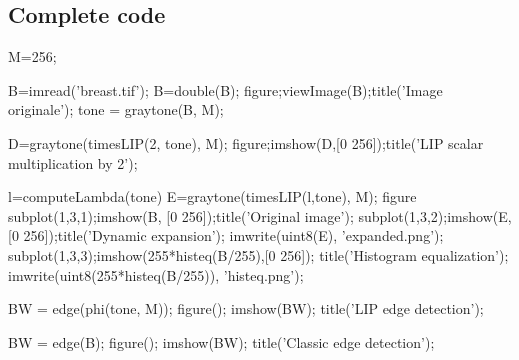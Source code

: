 \subsection{Complete \matlabregistered{} code}
\begin{matlab}
M=256;

B=imread('breast.tif');
B=double(B);
figure;viewImage(B);title('Image originale');
tone = graytone(B, M);

D=graytone(timesLIP(2, tone), M);
figure;imshow(D,[0 256]);title('LIP scalar multiplication by 2');


l=computeLambda(tone)
E=graytone(timesLIP(l,tone), M);
figure
subplot(1,3,1);imshow(B, [0 256]);title('Original image');
subplot(1,3,2);imshow(E,[0 256]);title('Dynamic expansion');
imwrite(uint8(E), 'expanded.png');
subplot(1,3,3);imshow(255*histeq(B/255),[0 256]);
title('Histogram equalization');
imwrite(uint8(255*histeq(B/255)), 'histeq.png');

BW = edge(phi(tone, M));
figure(); imshow(BW); title('LIP edge detection');

BW = edge(B);
figure(); imshow(BW); title('Classic edge detection');
\end{matlab}
